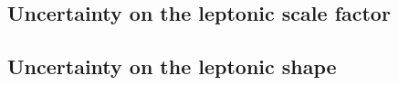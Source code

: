 \subsection{Uncertainty on the leptonic scale factor}
\label{sec:LeptonScaleUncertainty}
\subsection{Uncertainty on the leptonic \ias shape}
\label{sec:LeptonIasUncertainty}

